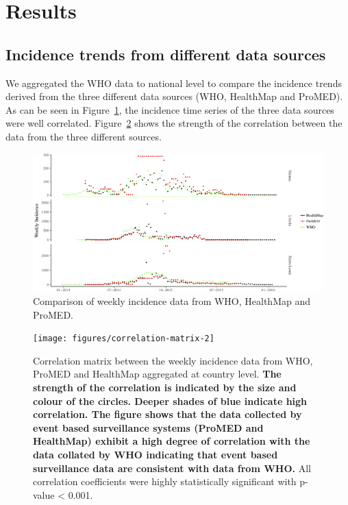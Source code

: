 \documentclass[a4paper,12pt]{article}
\begin{document}
\section{Results}
\subsection{Incidence trends from different data sources}
We aggregated the WHO data to national level to compare the incidence
trends derived from the three different data sources (WHO, HealthMap
and ProMED). As can be seen in Figure~\ref{fig:incid_comp}, the incidence time series
of the three data sources were well
correlated. Figure~\ref{fig:corrplot} shows the strength of the
correlation between the data from the three different sources.

\begin{figure}
    \centering
        \includegraphics[width=\textwidth]{figures/who_hm_pm_weekly_incid-2}
        \caption{Comparison of weekly incidence data from WHO, HealthMap and ProMED.}
        \label{fig:incid_comp}
  \end{figure}


  \begin{figure}
    \centering
    \texttt{[image: figures/correlation-matrix-2]}
    \caption{Correlation matrix between the weekly incidence data from WHO,
      ProMED and HealthMap aggregated at country level. \textbf{The strength of the correlation is
      indicated by the size and colour of the circles.
      Deeper shades of blue indicate high correlation. The figure
      shows that the data collected by event based surveillance
      systems (ProMED and HealthMap) exhibit a
      high degree of correlation with the data collated by WHO
      indicating that  event based surveillance data are consistent with data
      from WHO.} All
      correlation coefficients were  highly statistically significant
      with p-value < 0.001.}
    \label{fig:corrplot}
  \end{figure}
\end{document}
